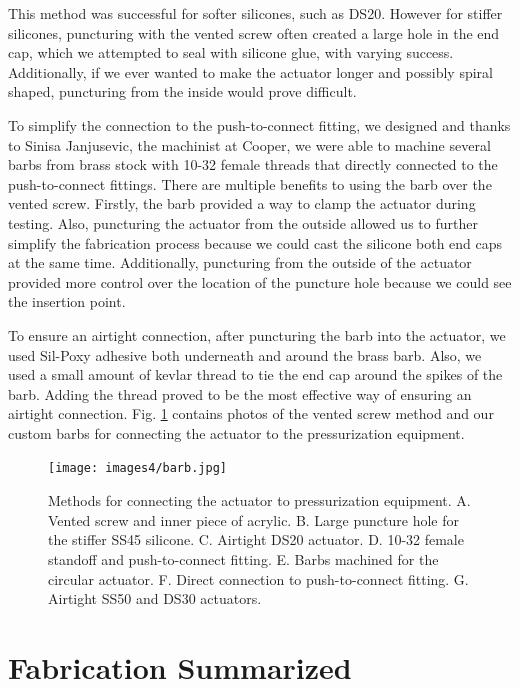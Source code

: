 This method was successful for softer silicones, such as DS20. However for stiffer silicones, puncturing with the vented screw often created a large hole in the end cap, which we attempted to seal with silicone glue, with varying success. Additionally, if we ever wanted to make the actuator longer and possibly spiral shaped, puncturing from the inside would prove difficult. 

To simplify the connection to the push-to-connect fitting, we designed and thanks to Sinisa Janjusevic, the machinist at Cooper, we were able to machine several barbs from brass stock with 10-32 female threads that directly connected to the push-to-connect fittings. There are multiple benefits to using the barb over the vented screw. Firstly, the barb provided a way to clamp the actuator during testing. Also, puncturing the actuator from the outside allowed us to further simplify the fabrication process because we could cast the silicone both end caps at the same time. Additionally, puncturing from the outside of the actuator provided more control over the location of the puncture hole because we could see the insertion point. 

To ensure an airtight connection, after puncturing the barb into the actuator, we used Sil-Poxy adhesive both underneath and around the brass barb. Also, we used a small amount of kevlar thread to tie the end cap around the spikes of the barb. Adding the thread proved to be the most effective way of ensuring an airtight connection. Fig. \ref{fig:barb} contains photos of the vented screw method and our custom barbs for connecting the actuator to the pressurization equipment. 

\begin{figure}[h!]
    \centering
    \texttt{[image: images4/barb.jpg]}
    \caption{Methods for connecting the actuator to pressurization equipment. A. Vented screw and inner piece of acrylic. B. Large puncture hole for the stiffer SS45 silicone. C. Airtight DS20 actuator. D. 10-32 female standoff and push-to-connect fitting. E. Barbs machined for the circular actuator. F. Direct connection to push-to-connect fitting. G. Airtight SS50 and DS30 actuators. }
    \label{fig:barb}
\end{figure}

\clearpage
\section{Fabrication Summarized}

